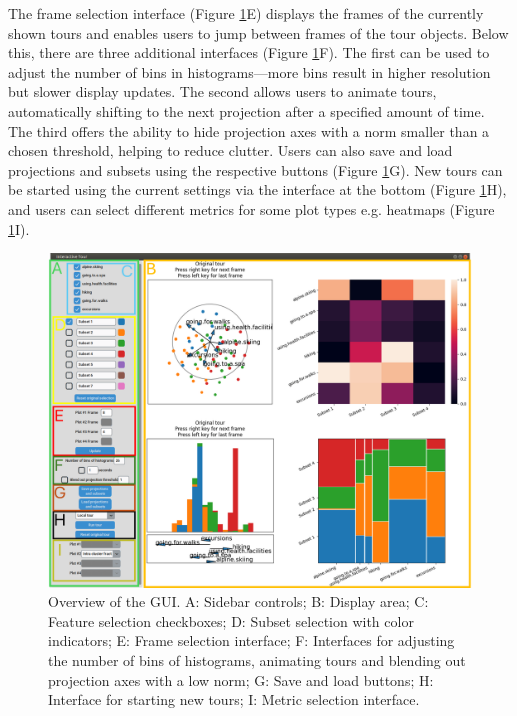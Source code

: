\documentclass[article]{ajs}
\begin{document}
The frame selection interface (Figure \ref{fig:GUI_overview}E) displays the frames of the currently shown tours and enables users to jump between frames of the tour objects. Below this, there are three additional interfaces (Figure \ref{fig:GUI_overview}F). The first can be used to adjust the number of bins in histograms—more bins result in higher resolution but slower display updates. The second allows users to animate tours, automatically shifting to the next projection after a specified amount of time. The third offers the ability to hide projection axes with a norm smaller than a chosen threshold, helping to reduce clutter. Users can also save and load projections and subsets using the respective buttons (Figure \ref{fig:GUI_overview}G). New tours can be started using the current settings via the interface at the bottom (Figure \ref{fig:GUI_overview}H), and users can select different metrics for some plot types e.g. heatmaps (Figure \ref{fig:GUI_overview}I).

\begin{figure}[h!]
    \centering
    \includegraphics[width=1\textwidth]{GUI_overview.png}
    \caption{Overview of the GUI. A: Sidebar controls; B: Display area; C: Feature selection checkboxes; D: Subset selection with color indicators; E: Frame selection interface; F: Interfaces for adjusting the number of bins of histograms, animating tours and blending out projection axes with a low norm; G: Save and load buttons; H: Interface for starting new tours; I: Metric selection interface.}
    \label{fig:GUI_overview}
\end{figure}
\end{document}
